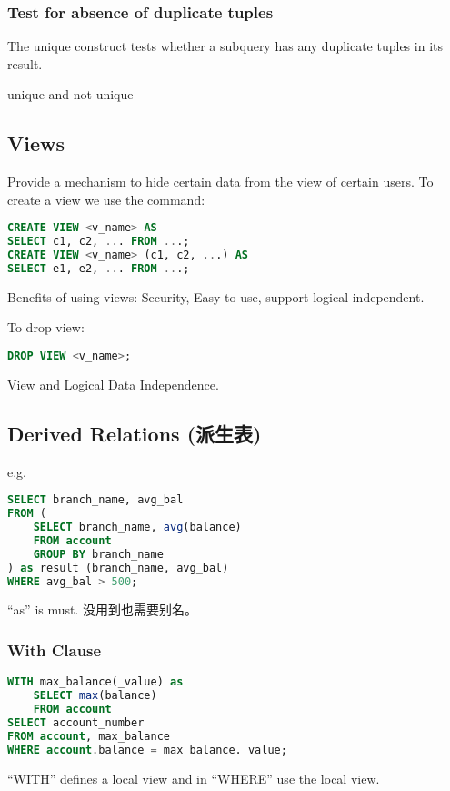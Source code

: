 \subsubsection{Test for absence of duplicate tuples}
The unique construct tests whether a subquery has any duplicate tuples in its result. 

unique and not unique

\subsection{Views}
Provide a mechanism to hide certain data from the view of certain users. To create a view we use the command:
\begin{lstlisting}[language=sql]
CREATE VIEW <v_name> AS
SELECT c1, c2, ... FROM ...; 
CREATE VIEW <v_name> (c1, c2, ...) AS
SELECT e1, e2, ... FROM ...; 
\end{lstlisting}

Benefits of using views: Security, Easy to use, support logical independent. 

To drop view: 
\begin{lstlisting}[language=sql]
DROP VIEW <v_name>;
\end{lstlisting}

View and Logical Data Independence. 

\subsection{Derived Relations (派生表)}

e.g. 
\begin{lstlisting}[language=sql]
SELECT branch_name, avg_bal
FROM (
    SELECT branch_name, avg(balance)
    FROM account
    GROUP BY branch_name
) as result (branch_name, avg_bal)
WHERE avg_bal > 500;
\end{lstlisting}

``as'' is must. 没用到也需要别名。  

\subsubsection{With Clause}
\begin{lstlisting}[language=sql]
WITH max_balance(_value) as
    SELECT max(balance)
    FROM account
SELECT account_number
FROM account, max_balance
WHERE account.balance = max_balance._value;
\end{lstlisting}

``WITH'' defines a local view and in ``WHERE'' use the local view. 

